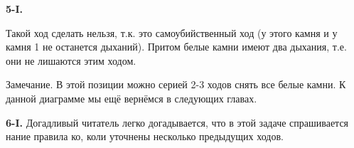 \documentclass[14pt,a4paper]{extarticle}
\newcommand{\stone}[3]{\filldraw[color=black, fill=#3, very thick](#1,#2) circle(0.45);}
\newcommand{\territory}[3]{\filldraw[color=black, fill=#3, very thick](#1, #2) circle(0.125);}
\newcommand{\stonelabel}[4]{\node[text=#3] at (#1,#2) {#4};}
\begin{document}
\noindent\textbf{5-I.} 

Такой ход сделать нельзя, т.к. это самоубийственный ход (у этого камня и у камня 1 не останется дыханий). Притом белые камни имеют два дыхания, т.е. они не лишаются этим ходом.

Замечание. В этой позиции можно серией 2-3 ходов снять все белые камни. К данной диаграмме мы ещё вернёмся в следующих главах.

\begin{figure}[h!]
	\centering
\end{figure}

\noindent\textbf{6-I.} Догадливый читатель легко догадывается, что в этой задаче спрашивается нание правила ко, коли уточнены несколько предыдущих ходов.
\end{document}
